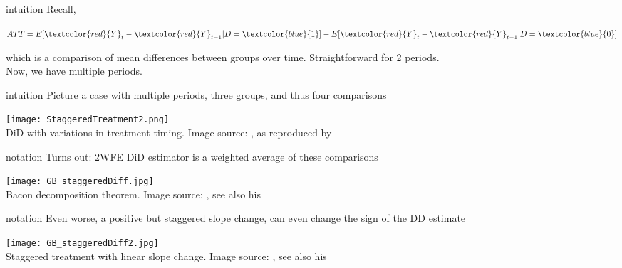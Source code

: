 \documentclass[aspectratio=169]{beamer}
\begin{document}
		\begin{frame}{intuition}
			Recall,
			\\ \vspace*{.25cm}
			\begin{center}
				\begin{math}
					ATT=E[\textcolor{red}{Y}_t - \textcolor{red}{Y}_{t-1}|D=\textcolor{blue}{1}] - E[\textcolor{red}{Y}_t-\textcolor{red}{Y}_{t-1}|D=\textcolor{blue}{0}]
				\end{math}
			\end{center}
			which is a comparison of mean differences between groups over time. Straightforward for 2 periods.
			\\ \vspace*{.25cm}
			Now, we have multiple periods.
		\end{frame}

		\begin{frame}{intuition}
			Picture a case with multiple periods, three groups, and thus four comparisons
			\begin{center}
				\texttt{[image: StaggeredTreatment2.png]}
				\\ \tiny{DiD with variations in treatment timing. Image source: \cite{Goodman-Bacon2018}, as reproduced by \href{https://andrewcbaker.netlify.app/2019/09/25/difference-in-differences-methodology/}{\underline{}}}
			\end{center}
		\end{frame}

		\begin{frame}{notation}
			Turns out: 2WFE DiD estimator is a weighted average of these comparisons
			\begin{center}
				\texttt{[image: GB\_staggeredDiff.jpg]}
				\\ \tiny{Bacon decomposition theorem. Image source: \cite{Goodman-Bacon2018}, see also his  \href{https://twitter.com/agoodmanbacon/status/1039126592604303360}{\underline{}}}
			\end{center}
		\end{frame}

			\begin{frame}{notation}
				Even worse, a positive but staggered slope change, can even change the sign of the DD estimate
				\begin{center}
					\texttt{[image: GB\_staggeredDiff2.jpg]}
					\\ \tiny{Staggered treatment with linear slope change. Image source: \cite{Goodman-Bacon2018}, see also his  \href{https://twitter.com/agoodmanbacon/status/1039126592604303360}{\underline{}}}
				\end{center}
			\end{frame}
\end{document}

